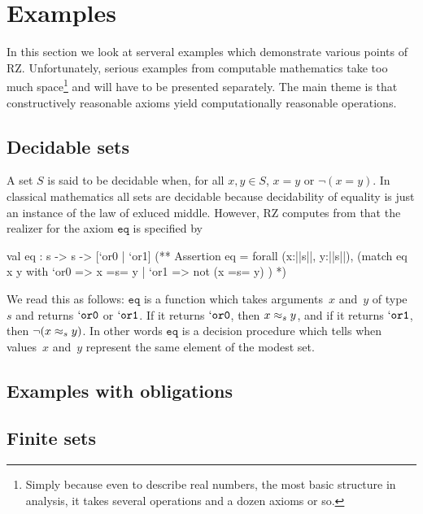 \section{Examples}
\label{sec:examples}

In this section we look at serveral examples which demonstrate various
points of RZ. Unfortunately, serious examples from computable
mathematics take too much space\footnote{Simply because even to
  describe real numbers, the most basic structure in analysis, it
  takes several operations and a dozen axioms or so.} and will have to
be presented separately. The main theme is that constructively
reasonable axioms yield computationally reasonable operations.

\subsection{Decidable sets}
\label{sec:decidable-sets}

A set $S$ is said to be decidable when, for all $x, y \in S$, $x = y$
or $\lnot (x = y)$. In classical mathematics all sets are decidable
because decidability of equality is just an instance of the law of
exluced middle. However, RZ computes from
%
%
that the realizer for the axiom $\mathtt{eq}$ is specified by
%
\begin{source}
val eq : s -> s -> [`or0 | `or1]
(**  Assertion eq =
       forall (x:||s||, y:||s||),
         (match eq x y with
            `or0 => x =s= y
          | `or1 => not (x =s= y)
          )
*)
\end{source}
%
We read this as follows: $\mathtt{eq}$ is a function which takes
arguments~$x$ and~$y$ of type~$s$ and returns $\mathtt{`or0}$ or
$\mathtt{`or1}$. If it returns $\mathtt{`or0}$, then $x \approx_s y$, and
if it returns $\mathtt{`or1}$, then $\lnot (x \approx_s y)$. In other
words $\mathtt{eq}$ is a decision procedure which tells when
values~$x$ and~$y$ represent the same element of the modest set.

\subsection{Examples with obligations}
\label{sec:exampl-with-oblig}


\subsection{Finite sets}
\label{sec:finite-sets}

